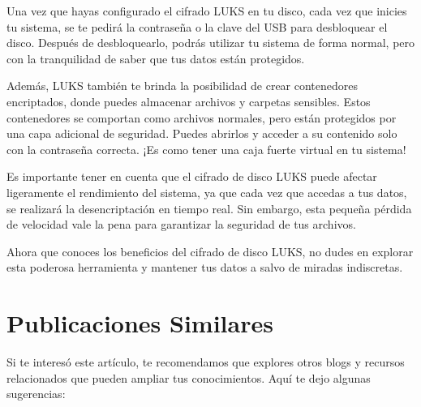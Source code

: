 \documentclass[
  jou,
  floatsintext,
  longtable,
  a4paper,
  nolmodern,
  notxfonts,
  notimes,
  colorlinks=true,linkcolor=blue,citecolor=blue,urlcolor=blue]{apa7}
\begin{document}
Una vez que hayas configurado el cifrado LUKS en tu disco, cada vez que
inicies tu sistema, se te pedirá la contraseña o la clave del USB para
desbloquear el disco. Después de desbloquearlo, podrás utilizar tu
sistema de forma normal, pero con la tranquilidad de saber que tus datos
están protegidos.

Además, LUKS también te brinda la posibilidad de crear contenedores
encriptados, donde puedes almacenar archivos y carpetas sensibles. Estos
contenedores se comportan como archivos normales, pero están protegidos
por una capa adicional de seguridad. Puedes abrirlos y acceder a su
contenido solo con la contraseña correcta. ¡Es como tener una caja
fuerte virtual en tu sistema!

Es importante tener en cuenta que el cifrado de disco LUKS puede afectar
ligeramente el rendimiento del sistema, ya que cada vez que accedas a
tus datos, se realizará la desencriptación en tiempo real. Sin embargo,
esta pequeña pérdida de velocidad vale la pena para garantizar la
seguridad de tus archivos.

Ahora que conoces los beneficios del cifrado de disco LUKS, no dudes en
explorar esta poderosa herramienta y mantener tus datos a salvo de
miradas indiscretas.

\section{Publicaciones Similares}\label{publicaciones-similares}

Si te interesó este artículo, te recomendamos que explores otros blogs y
recursos relacionados que pueden ampliar tus conocimientos. Aquí te dejo
algunas sugerencias:
\end{document}
